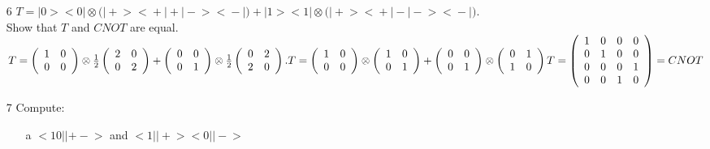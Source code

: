 \documentclass[11 pt]{article}
\theoremstyle{definition}
\theoremstyle{definition}
\def\ket#1{\big|{#1}\big>}
\def\bra#1{\big<{#1}\big|}
\begin{document}
\begin{enumerate}
\begin{enumerate}
\end{enumerate}
\newpage
\item[6] $T = \ket{0}\bra{0}\otimes\big(\ket{+}\bra{+} + \ket{-}\bra{-}\big) + \ket{1}\bra{1}\otimes\big(\ket{+}\bra{+} - \ket{-}\bra{-}\big)$.\\
\vspace*{.5cm}
Show that $T$ and $CNOT$ are equal.\\
\vspace*{.5cm}$T = \left( \begin{array}{cc}1&0 \\ 0&0\end{array}\right)\otimes\frac{1}{2}\left( \begin{array}{cc}2&0 \\ 0&2\end{array}\right) + \left( \begin{array}{cc}0&0 \\ 0&1\end{array}\right)\otimes\frac{1}{2}\left( \begin{array}{cc}0&2 \\ 2&0\end{array}\right).\\
T = \left( \begin{array}{cc}1&0 \\ 0&0\end{array}\right)\otimes\left( \begin{array}{cc}1&0 \\ 0&1\end{array}\right) + \left( \begin{array}{cc}0&0 \\ 0&1\end{array}\right)\otimes\left( \begin{array}{cc}0&1 \\ 1&0\end{array}\right)\\
T = \left( \begin{array}{cccc}1 & 0 & 0 & 0\\
						    0 & 1 & 0 & 0\\
						    0 & 0 & 0 & 1\\
						    0 & 0 & 1 & 0\\ \end{array}\right) = CNOT
$\\
\item[7] Compute:
\begin{enumerate}
\item[a] $\bra{10}\ket{+-}$ and $\bra{1}\ket{+}\bra{0}\ket{-}$\\

\end{enumerate}
\end{enumerate}
\end{document}
